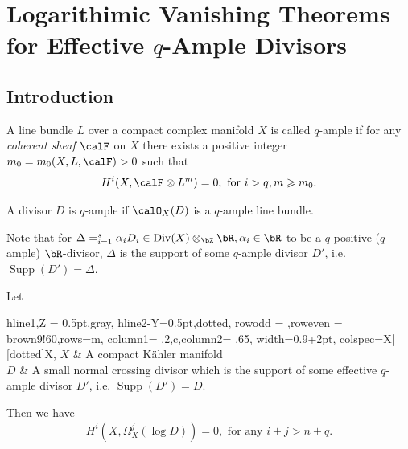 \documentclass[lang=en,12pt]{beautybook}
\newcommand{\pr}{'}
\begin{document}
\chapter{Logarithimic Vanishing Theorems for Effective \texorpdfstring{$q$}{}-Ample Divisors}
\section{Introduction}

\begin{definition}
  A line bundle $L$ over a compact complex manifold $X$ is called $q$-ample if for any \textit{coherent sheaf $\calF$} on $X$ there exists a positive integer $m_0=m_0(X,L,\calF)>0$ such that
  \[H^i(X,\calF\otimes L^m)=0, \text{ for } i>q, m\geqslant m_0.\]
\end{definition}
\begin{remark}
  A divisor $D$ is $q$-ample if $\calO_X(D)$ is a $q$-ample line bundle.
\end{remark}
Note that for $\Delta=\sum_{i=1}^s \alpha_i D_i\in \operatorname{Div}(X) \otimes_{\bZ} \bR, \alpha_i\in \bR$ to be a $q$-positive ($q$-ample) $\bR$-divisor, $\Delta$ is the support of some $q$-ample divisor $D\pr$, i.e. $\operatorname{Supp}(D\pr)=\Delta$.


\begin{theorem}
  Let
  \begin{center}
    \begin{tblr}{hline{1,Z} = {0.5pt,gray}, hline{2-Y}={0.5pt,dotted}, row{odd} = {},row{even} = {brown9!60},rows={m},  column{1}= {.2\linewidth,c},column{2}= {.65\linewidth},
      width=0.9\textwidth+2pt, colspec={X|[dotted]X},
      }
      $X$ & A compact K\"ahler manifold                                                                                                          \\
      $D$ & A small normal crossing divisor which is the support of some effective $q$-ample divisor $D\pr$, i.e. $\operatorname{Supp}(D\pr)=D$. \\
    \end{tblr}
  \end{center}
  Then we have
  $$
    H^i (X,\Omega_X^j (\log D))=0, \text{ for any } i+j> n+q.
  $$
\end{theorem}
\end{document}
